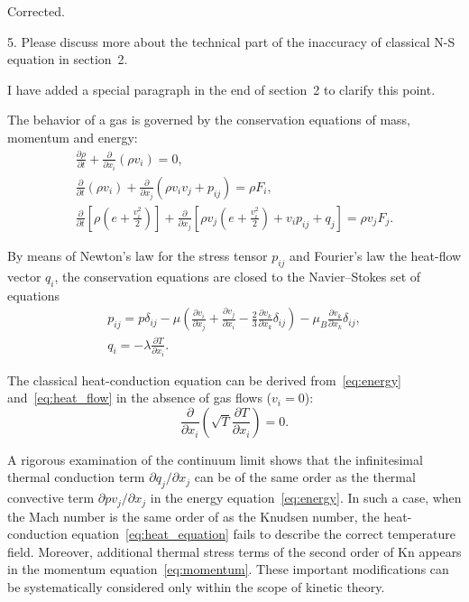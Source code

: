 \documentclass{article}
\newcommand{\Kn}{\mathrm{Kn}}
\newcommand{\pder}[2][]{\frac{\partial#1}{\partial#2}}
\newcommand{\Pder}[2][]{\partial#1/\partial#2}
\def\asterism{\par\vspace{1em}{\centering\scalebox{1}{\bfseries *~*~*}\par}\vspace{.5em}\par}
\begin{document}
Corrected.

\begin{quoting} 
5. Please discuss more about the technical part of the inaccuracy of
classical N-S equation in section~2.
\end{quoting}

I have added a special paragraph in the end of section~2 to clarify this point.

\begin{leftbar}
The behavior of a gas is governed by the conservation equations of mass, momentum and energy:
\begin{gather}
	\pder[\rho]{t} + \pder{x_i}(\rho v_i) = 0, \label{eq:mass}\\
	\pder{t}(\rho v_i) + \pder{x_j}(\rho v_i v_j + p_{ij}) = \rho F_i, \label{eq:momentum}\\
	\pder{t}\left[\rho\left(e+\frac{v_i^2}2\right)\right] +
		\pder{x_j}\left[\rho v_j\left(e+\frac{v_i^2}2\right)+v_i p_{ij}+q_j\right] = \rho v_j F_j. \label{eq:energy}
\end{gather}

\asterism

By means of Newton's law for the stress tensor \(p_{ij}\) and Fourier's law the heat-flow vector \(q_i\),
the conservation equations are closed to the Navier--Stokes set of equations
\begin{gather}
	p_{ij} = p\delta_{ij} - \mu\left(\pder[v_i]{x_j}+\pder[v_j]{x_i}-\frac23\pder[v_k]{x_k}\delta_{ij}\right) -
		\mu_B\pder[v_k]{x_k}\delta_{ij}, \label{eq:stress_tensor}\\
	q_i = -\lambda\pder[T]{x_i}. \label{eq:heat_flow}
\end{gather}

\asterism

The classical heat-conduction equation
can be derived from~\eqref{eq:energy} and~\eqref{eq:heat_flow}
in the absence of gas flows (\(v_i = 0\)):
\begin{equation}\label{eq:heat_equation}
	\pder{x_i}\left(\sqrt{T}\pder[T]{x_i}\right) = 0.
\end{equation}

\asterism

A rigorous examination of the continuum limit shows that the
infinitesimal thermal conduction term \(\Pder[q_j]{x_j}\) can be of the
same order as the thermal convective term \(\Pder[pv_j]{x_j}\) in the
energy equation~\eqref{eq:energy}. In such a case, when the Mach number
is the same order of as the Knudsen number, the heat-conduction
equation~\eqref{eq:heat_equation} fails to describe the correct
temperature field. Moreover, additional thermal stress terms of the
second order of \(\Kn\) appears in the momentum
equation~\eqref{eq:momentum}. These important modifications can be
systematically considered only within the scope of kinetic theory.
\end{leftbar}
\end{document}
